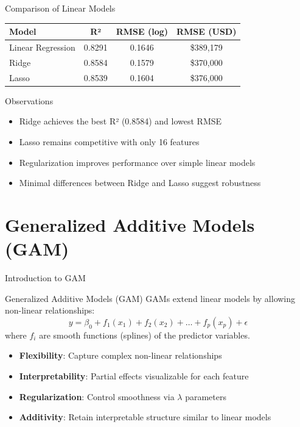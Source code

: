 \documentclass{beamer}
\begin{document}
\begin{frame}{Comparison of Linear Models}
    \begin{center}
        \begin{tabular}{@{}lccc@{}}
            \toprule
            \textbf{Model} & \textbf{R²} & \textbf{RMSE (log)} & \textbf{RMSE (USD)} \\
            \midrule
            Linear Regression  & 0.8291 & 0.1646 & \$389{,}179 \\
            Ridge              & 0.8584 & 0.1579 & \$370{,}000 \\
            Lasso              & 0.8539 & 0.1604 & \$376{,}000 \\
            \bottomrule
        \end{tabular}
    \end{center}
    \vspace{0.5cm}
    \begin{block}{Observations}
        \begin{itemize}
            \item Ridge achieves the best R² (0.8584) and lowest RMSE
            \item Lasso remains competitive with only 16 features
            \item Regularization improves performance over simple linear models
            \item Minimal differences between Ridge and Lasso suggest robustness
        \end{itemize}
    \end{block}
\end{frame}

\section{Generalized Additive Models (GAM)}

\begin{frame}{Introduction to GAM}
    \begin{block}{Generalized Additive Models (GAM)}
        GAMs extend linear models by allowing non-linear relationships:
        \begin{equation}
        y = \beta_0 + f_1(x_1) + f_2(x_2) + \ldots + f_p(x_p) + \epsilon
        \end{equation}
        where $f_i$ are smooth functions (splines) of the predictor variables.
    \end{block}
    
    \begin{itemize}
        \item \textbf{Flexibility}: Capture complex non-linear relationships
        \item \textbf{Interpretability}: Partial effects visualizable for each feature
        \item \textbf{Regularization}: Control smoothness via $\lambda$ parameters
        \item \textbf{Additivity}: Retain interpretable structure similar to linear models
    \end{itemize}
\end{frame}
\end{document}
